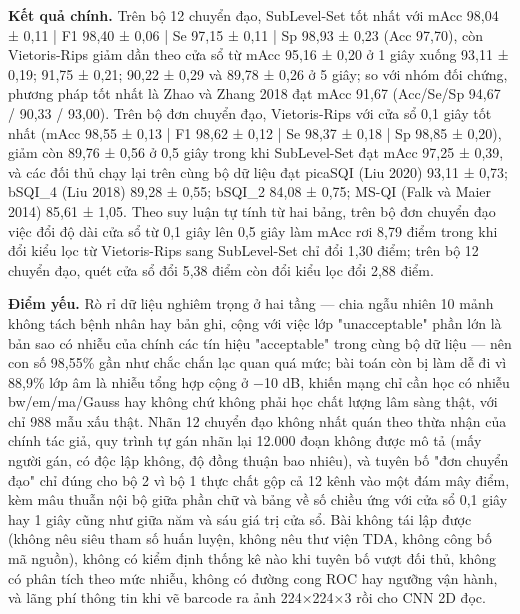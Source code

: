 \documentclass[12pt,a4paper]{article}
\begin{document}
\noindent \textbf{Kết quả chính.} Trên bộ 12 chuyển đạo, SubLevel-Set tốt nhất với mAcc 98,04 ± 0,11 | F1 98,40 ± 0,06 | Se 97,15 ± 0,11 | Sp 98,93 ± 0,23 (Acc 97,70), còn Vietoris-Rips giảm dần theo cửa sổ từ mAcc 95,16 ± 0,20 ở 1 giây xuống 93,11 ± 0,19; 91,75 ± 0,21; 90,22 ± 0,29 và 89,78 ± 0,26 ở 5 giây; so với nhóm đối chứng, phương pháp tốt nhất là Zhao và Zhang 2018 đạt mAcc 91,67 (Acc/Se/Sp 94,67 / 90,33 / 93,00). Trên bộ đơn chuyển đạo, Vietoris-Rips với cửa sổ 0,1 giây tốt nhất (mAcc 98,55 ± 0,13 | F1 98,62 ± 0,12 | Se 98,37 ± 0,18 | Sp 98,85 ± 0,20), giảm còn 89,76 ± 0,56 ở 0,5 giây trong khi SubLevel-Set đạt mAcc 97,25 ± 0,39, và các đối thủ chạy lại trên cùng bộ dữ liệu đạt picaSQI (Liu 2020) 93,11 ± 0,73; bSQI\_4 (Liu 2018) 89,28 ± 0,55; bSQI\_2 84,08 ± 0,75; MS-QI (Falk và Maier 2014) 85,61 ± 1,05. Theo suy luận tự tính từ hai bảng, trên bộ đơn chuyển đạo việc đổi độ dài cửa sổ từ 0,1 giây lên 0,5 giây làm mAcc rơi 8,79 điểm trong khi đổi kiểu lọc từ Vietoris-Rips sang SubLevel-Set chỉ đổi 1,30 điểm; trên bộ 12 chuyển đạo, quét cửa sổ đổi 5,38 điểm còn đổi kiểu lọc đổi 2,88 điểm.\par\vspace{3pt}
\noindent \textbf{Điểm yếu.} Rò rỉ dữ liệu nghiêm trọng ở hai tầng — chia ngẫu nhiên 10 mảnh không tách bệnh nhân hay bản ghi, cộng với việc lớp "unacceptable" phần lớn là bản sao có nhiễu của chính các tín hiệu "acceptable" trong cùng bộ dữ liệu — nên con số 98,55\% gần như chắc chắn lạc quan quá mức; bài toán còn bị làm dễ đi vì 88,9\% lớp âm là nhiễu tổng hợp cộng ở −10 dB, khiến mạng chỉ cần học có nhiễu bw/em/ma/Gauss hay không chứ không phải học chất lượng lâm sàng thật, với chỉ 988 mẫu xấu thật. Nhãn 12 chuyển đạo không nhất quán theo thừa nhận của chính tác giả, quy trình tự gán nhãn lại 12.000 đoạn không được mô tả (mấy người gán, có độc lập không, độ đồng thuận bao nhiêu), và tuyên bố "đơn chuyển đạo" chỉ đúng cho bộ 2 vì bộ 1 thực chất gộp cả 12 kênh vào một đám mây điểm, kèm mâu thuẫn nội bộ giữa phần chữ và bảng về số chiều ứng với cửa sổ 0,1 giây hay 1 giây cũng như giữa năm và sáu giá trị cửa sổ. Bài không tái lập được (không nêu siêu tham số huấn luyện, không nêu thư viện TDA, không công bố mã nguồn), không có kiểm định thống kê nào khi tuyên bố vượt đối thủ, không có phân tích theo mức nhiễu, không có đường cong ROC hay ngưỡng vận hành, và lãng phí thông tin khi vẽ barcode ra ảnh 224×224×3 rồi cho CNN 2D đọc.\par\vspace{3pt}
\end{document}
